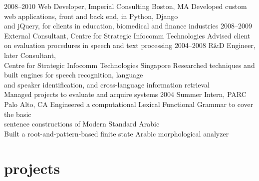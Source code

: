 \documentclass[]{friggeri-cv}
\begin{document}
\begin{entrylist}
  \entry
    {2008--2010}
    {Web Developer, Imperial Consulting}
    {Boston, MA}
    {
     \Squaredot Developed custom web applications, front and back end, in Python, Django \\ 
     \hspace*{3pt} and jQuery, for clients in education, biomedical and finance industries
    }
  \entry
    {2008--2009}
    {External Consultant, Centre for Strategic Infocomm Technologies}
    {}
    {\Squaredot Advised client on evaluation procedures in speech and text processing}
  \entry
    {2004--2008}
    {R\&D Engineer, later Consultant, \\ Centre for Strategic Infocomm Technologies}
    {Singapore}
    {\Squaredot Researched techniques and built engines for speech recognition, language \\
    \hspace*{3pt} and speaker identification, and cross-language information retrieval \\
    \Squaredot Managed projects to evaluate and acquire systems}
  \entry
    {2004}
    {Summer Intern, PARC}
    {Palo Alto, CA}
    {\Squaredot Engineered a computational Lexical Functional Grammar to cover the basic \\
     \hspace*{3pt} sentence constructions of Modern Standard Arabic \\
	\Squaredot Built a root-and-pattern-based finite state Arabic morphological analyzer}
\end{entrylist}

\section{projects}
\end{document}
